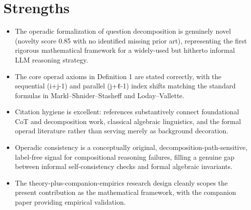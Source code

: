 \documentclass[11pt]{article}
\begin{document}
\section*{Strengths}
\begin{itemize}[leftmargin=*]
  \item The operadic formalization of question decomposition is genuinely novel (novelty score 0.85 with no identified missing prior art), representing the first rigorous mathematical framework for a widely-used but hitherto informal LLM reasoning strategy.
  \item The core operad axioms in Definition 1 are stated correctly, with the sequential (i+j-1) and parallel (j+ℓ-1) index shifts matching the standard formulas in Markl--Shnider--Stasheff and Loday--Vallette.
  \item Citation hygiene is excellent: references substantively connect foundational CoT and decomposition work, classical algebraic linguistics, and the formal operad literature rather than serving merely as background decoration.
  \item Operadic consistency is a conceptually original, decomposition-path-sensitive, label-free signal for compositional reasoning failures, filling a genuine gap between informal self-consistency checks and formal algebraic invariants.
  \item The theory-plus-companion-empirics research design cleanly scopes the present contribution as the mathematical framework, with the companion paper providing empirical validation.
\end{itemize}
\end{document}
